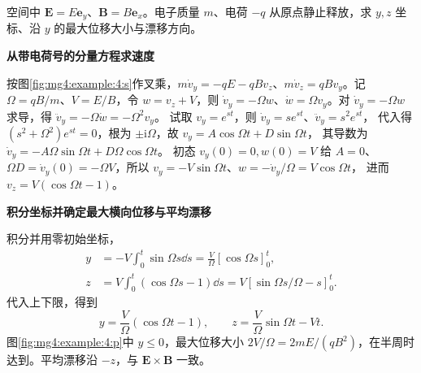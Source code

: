 \begin{question}\begin{example}[电子在垂直电磁场中的完整轨迹]\label{mg4:example:4}
空间中 $\bm E=E\bm e_y$、$\bm B=B\bm e_x$。电子质量 $m$、电荷 $-q$ 从原点静止释放，求 $y,z$ 坐标、沿 $y$ 的最大位移大小与漂移方向。
\end{example}
\end{question}
\begin{solution}\textbf{从带电荷号的分量方程求速度}\par\nobreak
按图\ref{fig:mg4:example:4:s}作叉乘，$m\dot v_y=-qE-qBv_z$、$m\dot v_z=qBv_y$。记 $\Omega=qB/m$、$V=E/B$，令 $w=v_z+V$，则 $\dot v_y=-\Omega w$、$\dot w=\Omega v_y$。对 $\dot v_y=-\Omega w$ 求导，得
$\ddot v_y=-\Omega\dot w=-\Omega^2v_y$。
试取 $v_y=e^{st}$，则 $\dot v_y=se^{st}$、$\ddot v_y=s^2e^{st}$，
代入得 $(s^2+\Omega^2)e^{st}=0$，根为 $\pm\mathrm i\Omega$，故
$v_y=A\cos\Omega t+D\sin\Omega t$，
其导数为 $\dot v_y=-A\Omega\sin\Omega t+D\Omega\cos\Omega t$。
初态 $v_y(0)=0,w(0)=V$ 给 $A=0$、
$\Omega D=\dot v_y(0)=-\Omega V$，所以
$v_y=-V\sin\Omega t$、$w=-\dot v_y/\Omega=V\cos\Omega t$，
进而 $v_z=V(\cos\Omega t-1)$。



\par\medskip{}\noindent\textbf{积分坐标并确定最大横向位移与平均漂移}\par\nobreak
积分并用零初始坐标，
\begin{align*}
 y&=-V\int_0^t\sin\Omega s\dd s
 =\frac V\Omega[\cos\Omega s]_0^t,\\
 z&=V\int_0^t(\cos\Omega s-1)\dd s
 =V[\sin\Omega s/\Omega-s]_0^t.
\end{align*}
代入上下限，得到
\[
y=\frac V\Omega(\cos\Omega t-1),\qquad
z=\frac V\Omega\sin\Omega t-Vt.
\]
图\ref{fig:mg4:example:4:p}中 $y\le0$，最大位移大小 $2V/\Omega=2mE/(qB^2)$，在半周时达到。平均漂移沿 $-z$，与 $\bm E\times\bm B$ 一致。


\end{solution}
